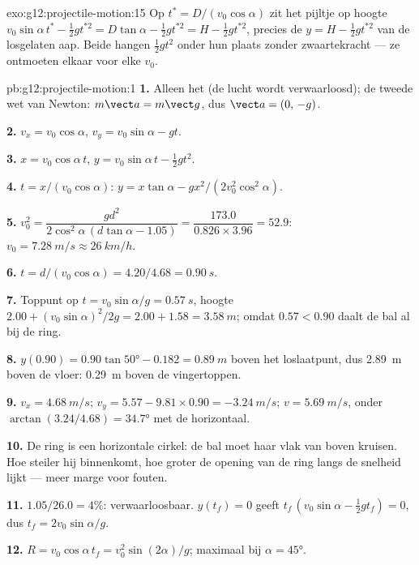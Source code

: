 \begin{solution}{exo:g12:projectile-motion:15}
Op $t^* = D/(v_0\cos\alpha)$ zit het pijltje op hoogte
$v_0\sin\alpha\, t^* - \tfrac12 g t^{*2} = D\tan\alpha - \tfrac12 g
t^{*2} = H - \tfrac12 g t^{*2}$, precies de $y = H - \tfrac12 g t^{*2}$ van
de losgelaten aap. Beide hangen $\tfrac12 gt^2$ onder hun plaats zonder
zwaartekracht --- ze ontmoeten elkaar voor elke $v_0$.
\end{solution}

\begin{solution}{pb:g12:projectile-motion:1}
\textbf{1.} Alleen het  (de lucht wordt verwaarloosd); de tweede wet
van Newton: $m\vect a = m\vect g$, dus $\vect a = (0,\,-g)$.

\textbf{2.} $v_x = v_0\cos\alpha$, $v_y = v_0\sin\alpha - gt$.

\textbf{3.} $x = v_0\cos\alpha\, t$,
$y = v_0\sin\alpha\, t - \tfrac12 gt^2$.

\textbf{4.} $t = x/(v_0\cos\alpha)$:
$y = x\tan\alpha - g x^2/(2v_0^2\cos^2\alpha)$.

\textbf{5.} $v_0^2 = \dfrac{g d^2}{2\cos^2\alpha\,(d\tan\alpha -
1.05)} = \dfrac{173.0}{0.826 \times 3.96} = 52.9$:
$v_0 = \qty{7.28}{m/s} \approx \qty{26}{km/h}$.

\textbf{6.} $t = d/(v_0\cos\alpha) = 4.20/4.68 = \qty{0.90}{s}$.

\textbf{7.} Toppunt op $t = v_0\sin\alpha/g = \qty{0.57}{s}$, hoogte
$2.00 + (v_0\sin\alpha)^2/2g = 2.00 + 1.58 = \qty{3.58}{m}$; omdat
$0.57 < 0.90$ daalt de bal al bij de ring.

\textbf{8.} $y(0.90) = 0.90\tan\ang{50} - 0.182 = \qty{0.89}{m}$ boven het
loslaatpunt, dus \qty{2.89}{m} boven de vloer: \qty{0.29}{m} boven de
vingertoppen.

\textbf{9.} $v_x = \qty{4.68}{m/s}$;
$v_y = 5.57 - 9.81 \times 0.90 = \qty{-3.24}{m/s}$; $v = \qty{5.69}{m/s}$,
onder $\arctan(3.24/4.68) = \ang{34.7}$ met de horizontaal.

\textbf{10.} De ring is een horizontale cirkel: de bal moet haar vlak van
boven kruisen. Hoe steiler hij binnenkomt, hoe groter de opening van de ring
langs de snelheid lijkt --- meer marge voor fouten.

\textbf{11.} $1.05/26.0 = 4\%$: verwaarloosbaar. $y(t_f) = 0$ geeft
$t_f\,(v_0\sin\alpha - \tfrac12 g t_f) = 0$, dus
$t_f = 2v_0\sin\alpha/g$.

\textbf{12.} $R = v_0\cos\alpha\, t_f = v_0^2\sin(2\alpha)/g$; maximaal bij
$\alpha = \ang{45}$.


\end{solution}
